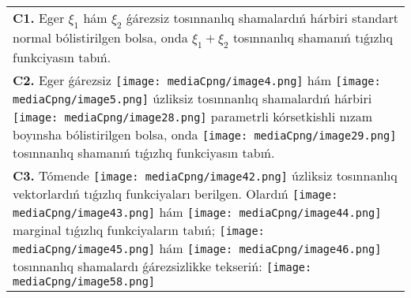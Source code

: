 \documentclass{article}
\begin{document}
\begin{tabular}{m{17cm}}
\textbf{C1.} Eger \(\xi_{1}\) hám \(\xi_{2}\) ǵárezsiz tosınnanlıq shamalardıń hárbiri standart normal bólistirilgen bolsa, onda \(\xi_{1} + \xi_{2}\) tosınnanlıq shamanıń tıǵızlıq funkciyasın tabıń.
 \\
\textbf{C2.} Eger ǵárezsiz \texttt{[image: mediaCpng/image4.png]} hám \texttt{[image: mediaCpng/image5.png]} úzliksiz tosınnanlıq shamalardıń hárbiri \texttt{[image: mediaCpng/image28.png]} parametrli kórsetkishli nızam boyınsha bólistirilgen bolsa, onda \texttt{[image: mediaCpng/image29.png]} tosınnanlıq shamanıń tıǵızlıq funkciyasın tabıń.
 \\
\textbf{C3.} Tómende \texttt{[image: mediaCpng/image42.png]} úzliksiz tosınnanlıq vektorlardıń tıǵızlıq funkciyaları berilgen. Olardıń \texttt{[image: mediaCpng/image43.png]} hám \texttt{[image: mediaCpng/image44.png]} marginal tıǵızlıq funkciyaların tabıń; \texttt{[image: mediaCpng/image45.png]} hám \texttt{[image: mediaCpng/image46.png]} tosınnanlıq shamalardı ǵárezsizlikke tekseriń: \texttt{[image: mediaCpng/image58.png]}
 \\

\end{tabular}
\vspace{1cm}
\end{document}
